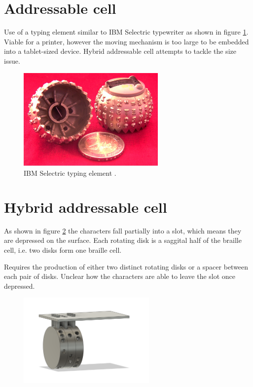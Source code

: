 \section{Addressable cell}
Use of a typing element similar to IBM Selectric typewriter as shown in figure \ref{fig:IBM_Selectric_Globe_Wiki.jpg}. Viable for a printer, however the moving mechanism is too large to be embedded into a tablet-sized device. Hybrid addressable cell attempts to tackle the size issue.
\begin{figure}[h]
\centering
    \includegraphics[height=5cm]{figures/IBM_Selectric_Globe_Wiki.jpg}
\caption{IBM Selectric typing element \cite{wiki:IBMSelectric}.}
\label{fig:IBM_Selectric_Globe_Wiki.jpg}
\end{figure}

\section{Hybrid addressable cell}
As shown in figure \ref{fig:rotation.png} the characters fall partially into a slot, which means they are depressed on the surface. Each rotating disk is a saggital half of the braille cell, i.e. two disks form one braille cell.

Requires the production of either two distinct rotating disks or a spacer between each pair of disks. Unclear how the characters are able to leave the slot once depressed.
\begin{figure}[h]
\centering
    \includegraphics[width=0.6\textwidth]{figures/rotation.png}
\caption{}
\label{fig:rotation.png}
\end{figure}

